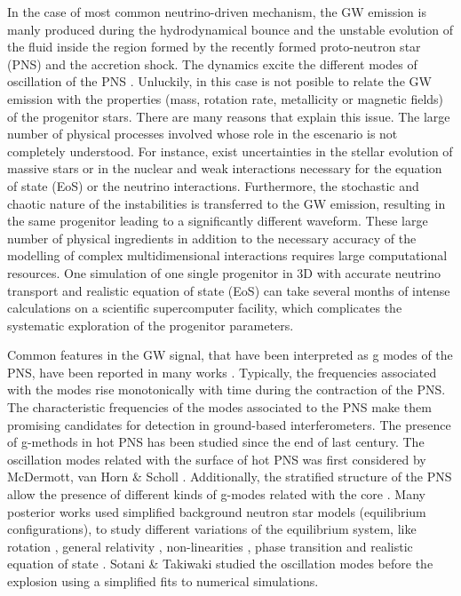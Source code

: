In the case of most common neutrino-driven mechanism, the GW emission is manly produced during the hydrodynamical bounce and the unstable evolution of the fluid inside the region formed by the recently formed proto-neutron star (PNS) and the accretion shock. The dynamics excite the different modes of oscillation of the PNS \cite{kokkotas, Friedman:2013}. Unluckily, in this case is not posible to relate the GW emission with the properties (mass, rotation rate, metallicity or magnetic fields) of the progenitor stars. There are many reasons that explain this issue. The large number of physical processes involved whose role in the escenario is not completely understood. For instance, exist uncertainties in the stellar evolution of massive stars or in the nuclear and weak interactions necessary for the equation of state (EoS) or the neutrino interactions. Furthermore, the stochastic and chaotic nature of the instabilities is transferred to the GW emission, resulting in the same progenitor leading to a significantly different waveform.
These large number of physical ingredients in addition to the necessary accuracy of the modelling of complex multidimensional interactions requires large computational resources. One simulation of one single progenitor in 3D with accurate neutrino transport and realistic equation of state (EoS) can take several months of intense calculations on a scientific supercomputer facility, which complicates the systematic exploration of the progenitor parameters.

Common features in the GW signal, that have been interpreted as g modes of the PNS, have been reported in many works \cite{murphy:09, Cerda:2013, mueller:13gw, Yakunin:2015, Kuroda:2016, Andresen:2017}. Typically, the frequencies associated with the modes rise monotonically with time during the contraction of the PNS. The characteristic frequencies of the modes associated to the PNS make them promising candidates for detection in ground-based interferometers. The presence of g-methods in hot PNS has been studied since the end of last century. The oscillation modes related with the surface of hot PNS was first considered by McDermott, van Horn \& Scholl \cite{McDermott:1983}. Additionally, the stratified structure of the PNS allow the presence of different kinds of g-modes related with the core \cite{Reisenegger:1992}. Many posterior works used simplified background neutron star models (equilibrium configurations), to study different variations of the equilibrium system, like rotation \cite{Ferrari:2004}, general relativity \cite{Passamonti:2005}, non-linearities \cite{Dimmelmeier:2006}, phase transition \cite{Kruger:2015} and realistic equation of state \cite{Camelio:2017}. Sotani \& Takiwaki \cite{Sotani:2016} studied the oscillation modes before the explosion using a simplified fits to numerical simulations.

